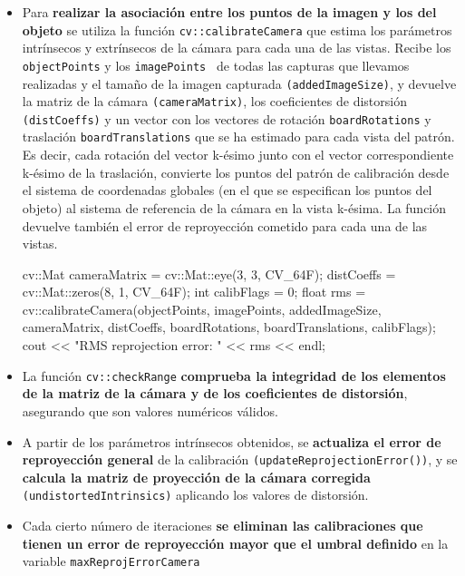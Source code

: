 \begin{itemize}
\item Para \textbf{realizar la asociación entre los puntos de la imagen y los del objeto} se utiliza la función \texttt{cv::calibrateCamera} que estima los parámetros intrínsecos y extrínsecos de la cámara para cada una de las vistas. Recibe los \texttt{objectPoints} y los \texttt{imagePoints } de todas las capturas que llevamos realizadas y el tamaño de la imagen capturada \texttt{(addedImageSize)}, y devuelve la matriz de la cámara \texttt{(cameraMatrix)}, los coeficientes de distorsión \texttt{(distCoeffs)} y un vector con los vectores de rotación \texttt{boardRotations} y traslación \texttt{boardTranslations} que se ha estimado para cada vista del patrón. Es decir, cada rotación del vector k-ésimo junto con el vector correspondiente k-ésimo de la traslación, convierte los puntos del patrón de calibración desde el sistema de coordenadas globales (en el que se especifican los puntos del objeto) al sistema de referencia de la cámara en la vista k-ésima. La función devuelve también el error de reproyección cometido para cada una de las vistas.

\begin{listing}[
  float=ht,
  language = C++,
  caption  = {Calibrado de la cámara mediante \texttt{cv::calibrateCamera} },
   label    = code:calibrateCamera]
   cv::Mat cameraMatrix = cv::Mat::eye(3, 3, CV_64F);
   distCoeffs = cv::Mat::zeros(8, 1, CV_64F);
   int calibFlags = 0;
   float rms = cv::calibrateCamera(objectPoints, imagePoints, addedImageSize, cameraMatrix, distCoeffs, boardRotations, boardTranslations, calibFlags);
   cout << "RMS reprojection error: " << rms << endl;
 \end{listing}

\item La función \texttt{cv::checkRange} \textbf{comprueba la integridad de los elementos de la matriz de la cámara y de los coeficientes de distorsión}, asegurando que son valores numéricos válidos. 

\item A partir de los parámetros intrínsecos obtenidos, se \textbf{actualiza el error de reproyección general} de la calibración \texttt{(updateReprojectionError())}, y se \textbf{calcula la matriz de proyección de la cámara corregida} \texttt{(undistortedIntrinsics)} aplicando los valores de distorsión.
  
\item Cada cierto número de iteraciones \textbf{se eliminan las calibraciones que tienen un error de reproyección mayor que el umbral definido} en la variable \texttt{maxReprojErrorCamera}
      

\end{itemize}
